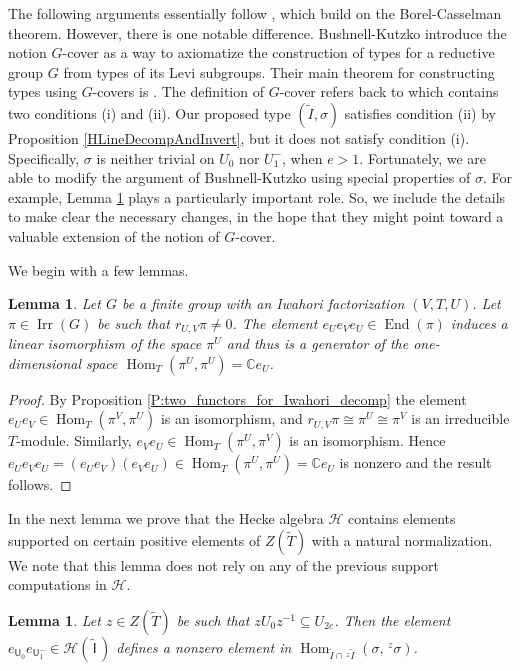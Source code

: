 \documentclass[10pt, letterpaper]{amsart}
\theoremstyle{plain}
\newtheorem{Lem}[equation]{Lemma}
\theoremstyle{definition}
\numberwithin{equation}{section}
\newcommand{\It}{\widetilde{I}}
\newcommand{\Tt}{\widetilde{T}}
\newcommand{\Irr}{\operatorname{Irr}}
\newcommand{\End}{\operatorname{End}}
\newcommand{\Hom}{\operatorname{Hom}}
\newcommand{\Hcal}{\mathcal{H}}
\newcommand{\Uf}{\mathsf{U}}
\newcommand{\Ift}{\widetilde{\mathsf{I}}}
\begin{document}
The following arguments essentially follow \cite{BK98}, which build on the Borel-Casselman theorem. However, there is one notable difference. Bushnell-Kutzko introduce the notion $G$-cover \cite[(8.1) Definition]{BK98} as a way to axiomatize the construction of types for a reductive group $G$ from types of its Levi subgroups. Their main theorem for constructing types using $G$-covers is \cite[(8.3) Theorem]{BK98}. The definition of $G$-cover refers back to \cite[(6.1) Definition]{BK98} which contains two conditions (i) and (ii). Our proposed type $(\It,\sigma)$ satisfies condition (ii) by Proposition \ref{HLineDecompAndInvert}, but it does not satisfy condition (i). Specifically, $\sigma$ is neither trivial on $U_{0}$ nor $U^{-}_{1}$, when $e>1$. Fortunately, we are able to modify the argument of Bushnell-Kutzko using special properties of $\sigma$. For example, Lemma \ref{VeryPosSupp} plays a particularly important role. So, we include the details to make clear the necessary changes, in the hope that they might point toward a valuable extension of the notion of $G$-cover.

We begin with a few lemmas.

\begin{Lem}\label{L3to1}
	Let $G$ be a finite group with an Iwahori factorization $(V,T,U)$. Let $\pi\in \Irr(G)$ be such that $r_{U,V}\pi\neq 0$. The element $e_{U}e_{V}e_{U}\in \End({\pi})$ induces a linear isomorphism of the space $\pi^{U}$ and thus is a generator of the one-dimensional space $\Hom_{T}(\pi^{U},\pi^{U})=\mathbb{C}e_{U}$.
\end{Lem}

\begin{proof}
	By Proposition \ref{P:two_functors_for_Iwahori_decomp} the element $e_{U}e_{V}\in \Hom_{T}(\pi^{V},\pi^{U})$ is an isomorphism, and $r_{U,V}\pi\cong \pi^{U}\cong \pi^{V}$ is an irreducible $T$-module. Similarly, $e_{V}e_{U}\in \Hom_{T}(\pi^{U},\pi^{V})$ is an isomorphism. Hence $e_{U}e_{V}e_{U}=(e_Ue_V)(e_Ve_U)\in \Hom_{T}(\pi^{U},\pi^{U})=\mathbb{C}e_{U}$ is nonzero and the result follows.
\end{proof}

In the next lemma we prove that the Hecke algebra $\Hcal$ contains elements supported on certain positive elements of $Z(\Tt)$ with a natural normalization. We note that this lemma does not rely on any of the previous support computations in $\Hcal$. 

\begin{Lem}\label{VeryPosSupp}
	Let $z\in Z(\Tt)$ be such that $zU_{0}z^{-1}\subseteq U_{2e}$. Then the element $e_{\Uf_{0}}e_{\Uf^{-}_{1}}\in\Hcal(\,\Ift\,)$ defines a nonzero element in $\Hom_{\It\cap\,^{z}\It}(\sigma,\,^{z}\sigma)$.
\end{Lem}
\end{document}
